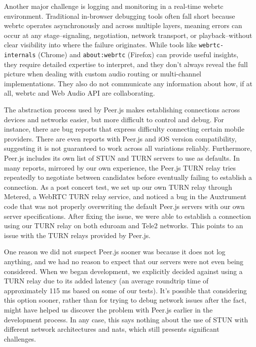 \documentclass[fleqn]{jaes}
\begin{document}
Another major challenge is logging and monitoring in a real-time \gls{webrtc} environment. Traditional in-browser debugging tools often fall short because \gls{webrtc} operates asynchronously and across multiple layers, meaning errors can occur at any stage--signaling, negotiation, network transport, or playback--without clear visibility into where the failure originates. While tools like \texttt{webrtc-internals} (Chrome) and \texttt{about:webrtc} (Firefox) can provide useful insights, they require detailed expertise to interpret, and they don’t always reveal the full picture when dealing with custom audio routing or multi-channel implementations. They also do not communicate any information about how, if at all, \gls{webrtc} and Web Audio API are collaborating.

The abstraction process used by Peer.js makes establishing connections across devices and networks easier, but more difficult to control and debug. For instance, there are bug reports that express difficulty connecting certain mobile providers. There are even reports with Peer.js and iOS version compatibility, suggesting it is not guaranteed to work across all variations reliably. Furthermore, Peer.js includes its own list of STUN and TURN servers to use as defaults. In many reports, mirrored by our own experience, the Peer.js TURN relay tries repeatedly to negotiate between candidates before eventually failing to establish a connection. As a post concert test, we set up our own TURN relay through Metered, a WebRTC TURN relay service, and noticed a bug in the Auxtrument code that was not properly overwriting the default Peer.js servers with our own server specifications. After fixing the issue, we were able to establish a connection using our TURN relay on both eduroam and Tele2 networks. This points to an issue with the TURN relays provided by Peer.js.

One reason we did not suspect Peer.js sooner was because it does not log anything, and we had no reason to expect that our servers were not even being considered. When we began development, we explicitly decided against using a TURN relay due to its added latency (an average roundtrip time of approximately 115 ms based on some of our tests). It's possible that considering this option sooner, rather than for trying to debug network issues after the fact, might have helped us discover the problem with Peer.js earlier in the development process. In any case, this says nothing about the use of STUN with different network architectures and \Glspl{nat}, which still presents significant challenges.
\end{document}
